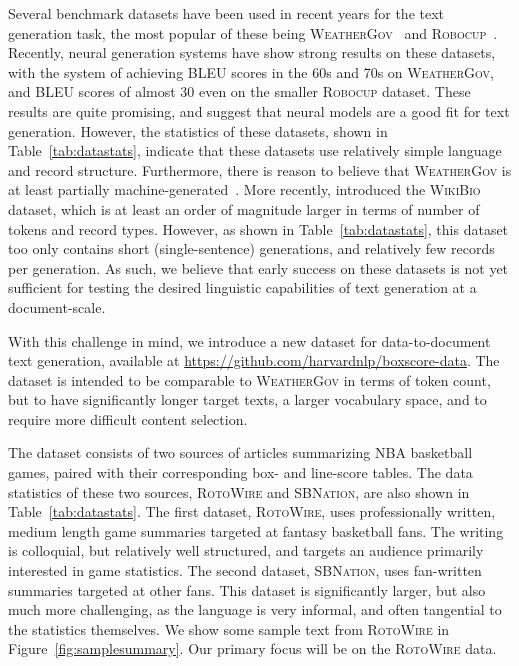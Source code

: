 \documentclass[11pt,letterpaper]{article}
\begin{document}
Several benchmark datasets have been used in recent years for the text
generation task, the most popular of these being
\textsc{WeatherGov}~\cite{liang2009learning} and
\textsc{Robocup}~\cite{chen2008learning}. Recently, neural generation
systems have show strong results on these datasets, with the system of
 achieving BLEU scores in the 60s and 70s on
\textsc{WeatherGov}, and BLEU scores of almost 30 even on the smaller
\textsc{Robocup} dataset. These results are quite promising, and suggest that neural models are
a good fit for text generation. However, the statistics of these
datasets, shown in Table~\ref{tab:datastats}, indicate that these
datasets use relatively simple language and record structure. Furthermore, there is reason to believe that \textsc{WeatherGov} is at least partially machine-generated~\citep{reiterblog}.
More recently, \citet{lebret2016neural} introduced the \textsc{WikiBio} dataset, which is at least an order of magnitude larger in terms of number of tokens and record types. However, as shown in Table~\ref{tab:datastats}, this dataset too only contains short (single-sentence) generations, and relatively few records per generation. As such, we
believe that early success on these datasets is not yet sufficient for
testing the desired linguistic capabilities of text generation at a
document-scale.


With this challenge in mind, we introduce a new dataset for data-to-document text generation, available at \url{https://github.com/harvardnlp/boxscore-data}. The dataset is intended
to be comparable to \textsc{WeatherGov} in terms of token count, but to have significantly longer target texts, a larger vocabulary
space, and to require more difficult content selection.

The dataset consists of two sources of articles summarizing NBA basketball games, paired with their corresponding box- and line-score tables. The data statistics of these two sources, \textsc{RotoWire} and \textsc{SBNation}, are also shown in Table~\ref{tab:datastats}. The first dataset, \textsc{RotoWire}, uses professionally written, medium length game summaries targeted at fantasy basketball fans. The writing is colloquial, but relatively well structured, and targets an audience primarily interested in game statistics.
The second dataset, \textsc{SBNation}, uses fan-written summaries targeted at other fans. This dataset is significantly larger, but also much more challenging, as the language is very informal, and often tangential to the statistics themselves.
We show some sample text from \textsc{RotoWire} in Figure~\ref{fig:samplesummary}. 
Our primary focus will be on the \textsc{RotoWire} data.
\end{document}
